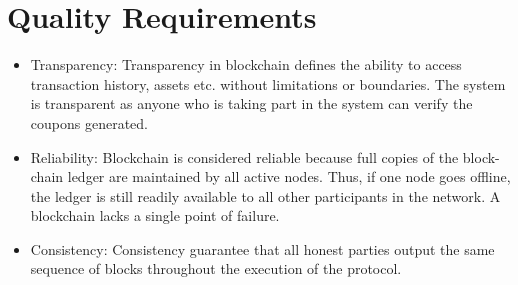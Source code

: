 \section{Quality Requirements} 
\begin{itemize}
    \item Transparency: Transparency in blockchain defines the ability to access transaction history, assets etc. without limitations or boundaries. The system is transparent as anyone who is taking part in the system can verify the coupons generated.
    \item  Reliability: Blockchain is considered reliable because full copies of the block- chain ledger are maintained by all active nodes. Thus, if one node goes offline, the ledger is still readily available to all other participants in the network. A blockchain lacks a single point of failure. 
    \item  Consistency: Consistency guarantee that all honest parties output the same sequence of blocks throughout the execution of the protocol.
\end{itemize}



